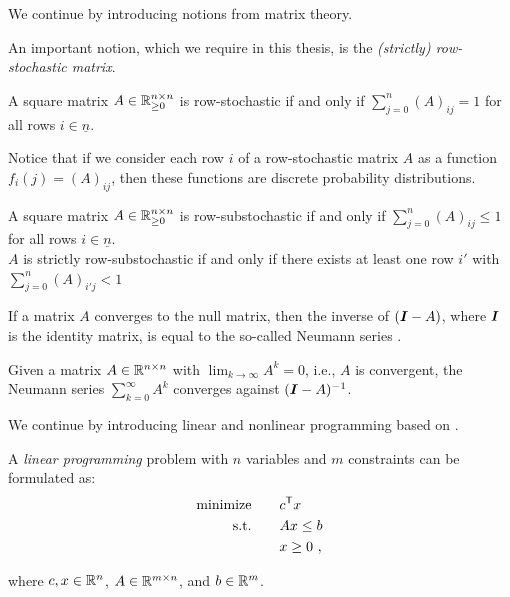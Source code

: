 We continue by introducing notions from matrix theory.

An important notion, which we require in this thesis, is the \textit{(strictly) row-stochastic matrix}.
\begin{definition}\label{def:row-stoch_matrix}
    A square matrix $A \in \mathbb{R}^{n\times n}_{\geq 0}$ is row-stochastic if and only if $\sum_{j=0}^n(A)_{ij} = 1$ for all rows $i \in \underline{n}$.
\end{definition}
Notice that if we consider each row $i$ of a row-stochastic matrix $A$ as a function $f_i(j)=(A)_{ij}$, then these functions are discrete probability distributions.

\begin{definition}\label{def:row-substoch_matrix}
    A square matrix $A \in \mathbb{R}^{n\times n}_{\geq 0}$ is row-substochastic if and only if $\sum_{j=0}^n(A)_{ij} \leq 1$ for all rows $i \in \underline{n}$.\\
    $A$ is strictly row-substochastic if and only if there exists at least one row $i'$ with $\sum_{j=0}^n(A)_{i'j} < 1$
\end{definition}

If a matrix $A$ converges to the null matrix, then the inverse of $(\bm{I} - A)$, where $\bm{I}$ is the identity matrix, is equal to the so-called Neumann series \cite{Neumann_Matheteil}.
\begin{definition}\label{def:neumann_series}
    Given a matrix $A\in \mathbb{R}^{n\times n}$ with $\lim_{k\rightarrow \infty}A^k = 0$, i.e., $A$ is convergent, the Neumann series $\sum_{k=0}^\infty A^k$ converges against $(\bm{I} - A)^{-1}$.
\end{definition}

We continue by introducing linear and nonlinear programming based on \cite{Luenberger_Book_Matheteil}.
\begin{definition}
    A \textit{linear programming} problem with $n$ variables and $m$ constraints can be formulated as:
    \begin{align}
    \text{minimize} \qquad & c^{\mathsf{T}} x \notag \\
    \text{s.t.} \qquad & Ax \leq b \notag \\
    & x \geq 0\ ,\notag
    \end{align}
    
    where $c,x \in \mathbb{R}^n$, $A\in \mathbb{R}^{m\times n}$, and $b\in \mathbb{R}^m$.
\end{definition}

